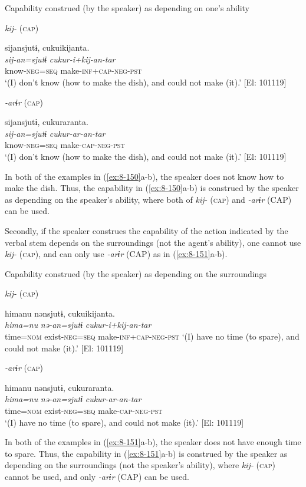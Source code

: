 \ea\label{ex:8-150}
  Capability construed (by the speaker) as depending on one’s ability

\ea \textit{kij-} (\textsc{cap})

  {\TM}
\glll  sijansjutɨ,  cukuikijanta.\\
\textit{sij-an=sjutɨ}  \textit{cukur-i+kij-an-tar}\\
    know-\textsc{neg}=\textsc{seq}  make-\textsc{inf}+\textsc{cap}-\textsc{neg}-\textsc{pst}\\
\glt ‘(I) don’t know (how to make the dish), and could not make (it).’ [El: 101119]


\ex \textit{-arɨr} (\textsc{cap})

  {\TM}
\glll  sijansjutɨ,  cukuraranta.\\
\textit{sij-an=sjutɨ}  \textit{cukur-ar-an-tar}\\
    know-\textsc{neg}=\textsc{seq}  make-\textsc{cap}-\textsc{neg}-\textsc{pst}\\
\glt ‘(I) don’t know (how to make the dish), and could not make (it).’ [El: 101119]
\z
\z

In both of the examples in (\ref{ex:8-150}a-b), the speaker does not know how to make the dish. Thus, the capability in (\ref{ex:8-150}a-b) is construed by the speaker as depending on the speaker’s ability, where both of \textit{kij-} (\textsc{cap}) and \textit{-arɨr} (CAP) can be used.

Secondly, if the speaker construes the capability of the action indicated by the verbal stem depends on the surroundings (not the agent’s ability), one cannot use \textit{kij-} (\textsc{cap}), and can only use \textit{-arɨr} (CAP) as in (\ref{ex:8-151}a-b).

\ea\label{ex:8-151}
  Capability construed (by the speaker) as depending on the surroundings

\ea \textit{kij-} (\textsc{cap})

  {\TM}
\glll  *himanu  nənsjutɨ,  cukuikijanta.\\
\textit{hima=nu}  \textit{nə-an=sjutɨ}  \textit{cukur-i+kij-an-tar}\\
    time=\textsc{nom}  exist-\textsc{neg}=\textsc{seq}  make-\textsc{inf}+\textsc{cap}-\textsc{neg}-\textsc{pst}
‘(I) have no time (to spare), and could not make (it).’ [El: 101119]


\ex \textit{-arɨr} (\textsc{cap})

  {\TM}
\glll  himanu  nənsjutɨ,  cukuraranta.\\
\textit{hima=nu}  \textit{nə-an=sjutɨ}  \textit{cukur-ar-an-tar}\\
    time=\textsc{nom}  exist-\textsc{neg}=\textsc{seq}  make-\textsc{cap}-\textsc{neg}-\textsc{pst}\\
\glt ‘(I) have no time (to spare), and could not make (it).’ [El: 101119]
\z
\z

In both of the examples in (\ref{ex:8-151}a-b), the speaker does not have enough time to spare. Thus, the capability in (\ref{ex:8-151}a-b) is construed by the speaker as depending on the surroundings (not the speaker’s ability), where \textit{kij-} (\textsc{cap}) cannot be used, and only \textit{-arɨr} (CAP) can be used.
